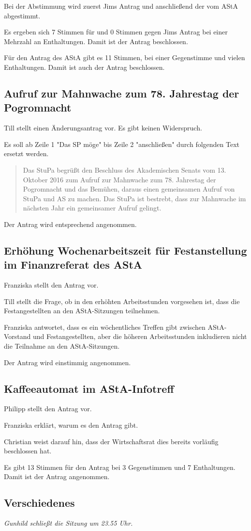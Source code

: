 \documentclass[ngerman,headheight=70pt]{scrartcl}
\begin{document}
    Bei der Abstimmung wird zuerst Jims Antrag und anschließend der vom AStA
    abgestimmt.

    Es ergeben sich 7 Stimmen für und 0 Stimmen gegen Jims Antrag bei einer
    Mehrzahl an Enthaltungen. Damit ist der Antrag beschlossen.

    Für den Antrag des AStA gibt es 11 Stimmen, bei einer Gegenstimme und vielen
    Enthaltungen. Damit ist auch der Antrag beschlossen.

    \subsection{Aufruf zur Mahnwache zum 78. Jahrestag der Pogromnacht}

    Till stellt einen Änderungsantrag vor. Es gibt keinen Widerspruch.

    Es soll ab Zeile 1 "Das SP möge" bis Zeile 2 "anschließen" durch folgenden
    Text ersetzt werden.

    \blockquote{
        Das StuPa begrüßt den Beschluss des Akademischen Senats vom 13. Oktober
        2016 zum Aufruf zur Mahnwache zum 78. Jahrestag der Pogromnacht und das
        Bemühen, daraus einen gemeinsamen Aufruf von StuPa und AS zu machen.
        Das StuPa ist bestrebt, dass zur Mahnwache im nächsten Jahr ein gemeinsamer
        Aufruf gelingt.
    }

    Der Antrag wird entsprechend angenommen.

    \subsection{Erhöhung Wochenarbeitszeit für Festanstellung im Finanzreferat des AStA}

    Franziska stellt den Antrag vor.

    Till stellt die Frage, ob in den erhöhten Arbeitsstunden vorgesehen ist,
    dass die Festangestellten an den AStA-Sitzungen teilnehmen.

    Franziska antwortet, dass es ein wöchentliches Treffen gibt zwischen AStA-Vorstand
    und Festangestellten, aber die höheren Arbeitsstunden inkludieren nicht
    die Teilnahme an den AStA-Sitzungen.

    Der Antrag wird einstimmig angenommen.

    \subsection{Kaffeeautomat im AStA-Infotreff}

    Philipp stellt den Antrag vor.

    Franziska erklärt, warum es den Antrag gibt.

    Christian weist darauf hin, dass der Wirtschaftsrat dies bereits vorläufig
    beschlossen hat.

    Es gibt 13 Stimmen für den Antrag bei 3 Gegenstimmen und 7 Enthaltungen.
    Damit ist der Antrag angenommen.

    \subsection{Verschiedenes}

    \textit{Gunhild schließt die Sitzung um 23.55 Uhr.}
\end{document}
